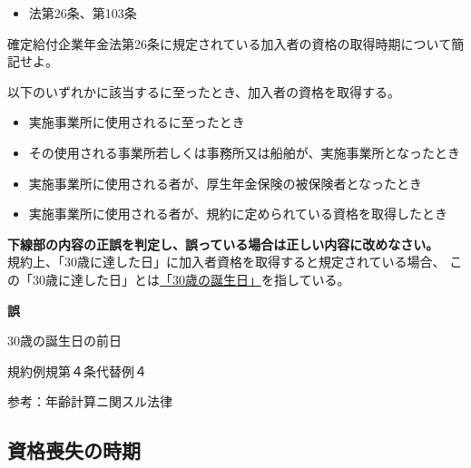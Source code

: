 \begin{InyouJobunbox}
  \begin{itemize}
    \item 法第26条、第103条
  \end{itemize}
\end{InyouJobunbox}

\begin{shortanswer}[自作 2026/10/11]
  確定給付企業年金法第26条に規定されている加入者の資格の取得時期について簡記せよ。
\end{shortanswer}

\begin{answerbox}
  以下のいずれかに該当するに至ったとき、加入者の資格を取得する。
  \begin{itemize}
    \item 実施事業所に使用されるに至ったとき
    \item その使用される事業所若しくは事務所又は船舶が、実施事業所となったとき
    \item 実施事業所に使用される者が、厚生年金保険の被保険者となったとき
    \item 実施事業所に使用される者が、規約に定められている資格を取得したとき
  \end{itemize}
\end{answerbox}

\begin{truefalse}[自作 2026/10/11]
    \textbf{下線部の内容の正誤を判定し、誤っている場合は正しい内容に改めなさい。}
  \\

  規約上、「30歳に達した日」に加入者資格を取得すると規定されている場合、
  この「30歳に達した日」とは\underline{「30歳の誕生日」}を指している。
\end{truefalse}

\begin{answerbox}
  \textbf{誤}

  30歳の誕生日の前日
\end{answerbox}

\begin{explanationbox}
  規約例規第４条代替例４

  参考：年齢計算ニ関スル法律
\end{explanationbox}

\newpage

\subsection{資格喪失の時期}

